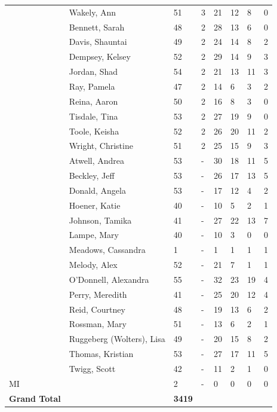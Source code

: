 \documentclass{article}\usepackage[]{graphicx}\usepackage[]{color}
\begin{document}
{\begin{longtable} { >{\raggedright}p{}p{}p{}p{}p{}p{}p{}p{}}
   \rowcolor[gray]{0.90} & Wakely, Ann & 51 & 3 & 21 & 12 & 8 & 0 \\ 
   \rowcolor[gray]{0.90} & Bennett, Sarah & 48 & 2 & 28 & 13 & 6 & 0 \\ 
   & Davis, Shauntai & 49 & 2 & 24 & 14 & 8 & 2 \\ 
   & Dempsey, Kelsey & 52 & 2 & 29 & 14 & 9 & 3 \\ 
   & Jordan, Shad & 54 & 2 & 21 & 13 & 11 & 3 \\ 
   \rowcolor[gray]{0.90} & Ray, Pamela & 47 & 2 & 14 & 6 & 3 & 2 \\ 
   \rowcolor[gray]{0.90} & Reina, Aaron & 50 & 2 & 16 & 8 & 3 & 0 \\ 
   \rowcolor[gray]{0.90} & Tisdale, Tina & 53 & 2 & 27 & 19 & 9 & 0 \\ 
   & Toole, Keisha & 52 & 2 & 26 & 20 & 11 & 2 \\ 
   & Wright, Christine & 51 & 2 & 25 & 15 & 9 & 3 \\ 
   & Atwell, Andrea & 53 & - & 30 & 18 & 11 & 5 \\ 
   \rowcolor[gray]{0.90} & Beckley, Jeff & 53 & - & 26 & 17 & 13 & 5 \\ 
   \rowcolor[gray]{0.90} & Donald, Angela & 53 & - & 17 & 12 & 4 & 2 \\ 
   \rowcolor[gray]{0.90} & Hoener, Katie & 40 & - & 10 & 5 & 2 & 1 \\ 
   & Johnson, Tamika & 41 & - & 27 & 22 & 13 & 7 \\ 
   & Lampe, Mary & 40 & - & 10 & 3 & 0 & 0 \\ 
   & Meadows, Cassandra & 1 & - & 1 & 1 & 1 & 1 \\ 
   \rowcolor[gray]{0.90} & Melody, Alex & 52 & - & 21 & 7 & 1 & 1 \\ 
   \rowcolor[gray]{0.90} & O'Donnell, Alexandra & 55 & - & 32 & 23 & 19 & 4 \\ 
   \rowcolor[gray]{0.90} & Perry, Meredith & 41 & - & 25 & 20 & 12 & 4 \\ 
   & Reid, Courtney & 48 & - & 19 & 13 & 6 & 2 \\ 
   & Rossman, Mary & 51 & - & 13 & 6 & 2 & 1 \\ 
   & Ruggeberg (Wolters), Lisa & 49 & - & 20 & 15 & 8 & 2 \\ 
   \rowcolor[gray]{0.90} & Thomas, Kristian & 53 & - & 27 & 17 & 11 & 5 \\ 
   \rowcolor[gray]{0.90} & Twigg, Scott & 42 & - & 11 & 2 & 1 & 0 \\ 
   \hline
MI &  & 2 & - & 0 & 0 & 0 & 0 \\ 
   \hline
\hline
\textbf{Grand Total} &  & \textbf{ 3419 } &  & {\textbf{1380} & {\textbf{830} & {\textbf{475} & {\textbf{135} \\ 
   \end{longtable}

}
\end{document}
